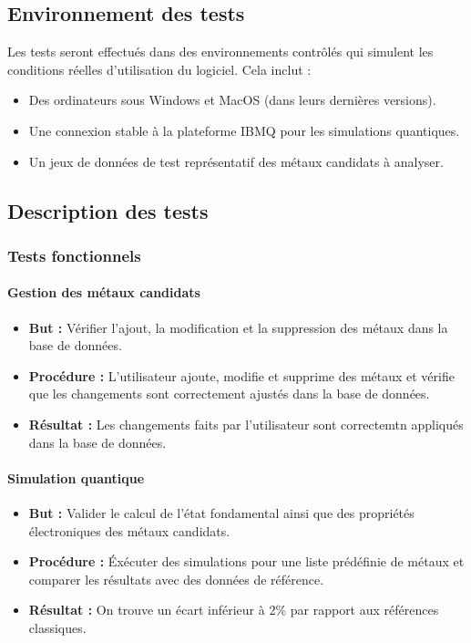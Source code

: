 \documentclass[11pt]{article}
\begin{document}
\subsection{Environnement des tests}
Les tests seront effectués dans des environnements contrôlés qui simulent les conditions réelles d'utilisation du logiciel. Cela inclut :
\begin{itemize}
  \item Des ordinateurs sous Windows et MacOS (dans leurs dernières versions).
  \item Une connexion stable à la plateforme IBMQ pour les simulations quantiques.
  \item Un jeux de données de test représentatif des métaux candidats à analyser.
\end{itemize}
\newpage
\subsection{Description des tests}
\subsubsection{Tests fonctionnels}
\paragraph{Gestion des métaux candidats}
\begin{itemize}
  \item \textbf{But :} Vérifier l'ajout, la modification et la suppression des métaux dans la base de données.
  \item \textbf{Procédure :} L'utilisateur ajoute, modifie et supprime des métaux et vérifie que les changements sont correctement ajustés dans la base de données.
  \item \textbf{Résultat :} Les changements faits par l'utilisateur sont correctemtn appliqués dans la base de données.
\end{itemize}
\paragraph{Simulation quantique}
\begin{itemize}
  \item \textbf{But :} Valider le calcul de l'état fondamental ainsi que des propriétés électroniques des métaux candidats.
  \item \textbf{Procédure :} Éxécuter des simulations pour une liste prédéfinie de métaux et comparer les résultats avec des données de référence.
  \item \textbf{Résultat :} On trouve un écart inférieur à 2\% par rapport aux références classiques.
\end{itemize}
\end{document}
